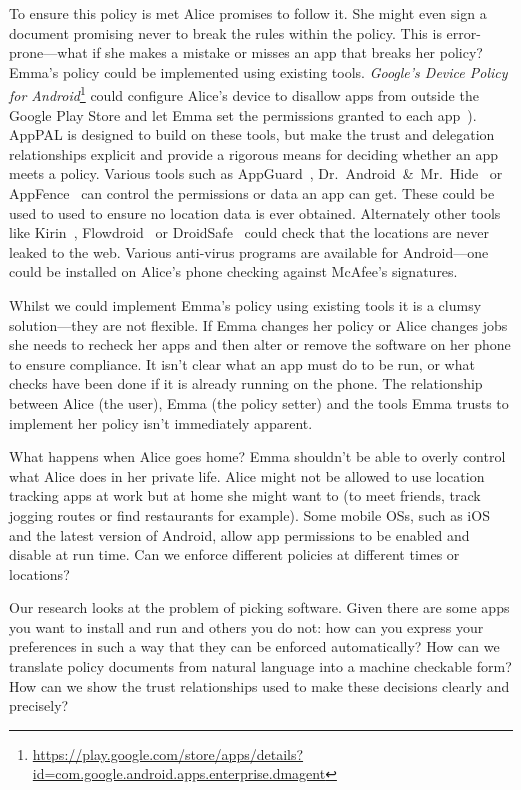 \documentclass[]{llncs}
\begin{document}
To ensure this policy is met Alice promises to follow it.
She might even sign a document promising never to break the rules within the policy.
This is error-prone---what if she makes a mistake or misses an app that breaks her policy?
Emma's policy could be implemented using existing tools.
\emph{Google's Device Policy for Android}\footnote{\url{https://play.google.com/store/apps/details?id=com.google.android.apps.enterprise.dmagent}} could configure Alice's device to disallow apps from outside the Google Play Store and let Emma set the permissions granted to each app~\cite{AndroidMPermission:2015uq}).
AppPAL is designed to build on these tools, but make the trust and delegation relationships explicit and provide a rigorous means for deciding whether an app meets a policy.
Various tools such as AppGuard~\cite{Backes:2012vm}, Dr.~Android~\&~Mr.~Hide~\cite{Jeon:2012ki} or AppFence~\cite{Hornyack:2011wq} can control the permissions or data an app can get.
These could be used to used to ensure no location data is ever obtained.
Alternately other tools like Kirin~\cite{Enck:2009ko}, Flowdroid~\cite{Fritz:2013vi} or DroidSafe~\cite{Gordon:2015et} could check that the locations are never leaked to the web.
Various anti-virus programs are available for Android---one could be installed on Alice's phone checking against McAfee's signatures.

Whilst we could implement Emma's policy using existing tools it is a clumsy solution---they are not flexible.
If Emma changes her policy or Alice changes jobs she needs to recheck her apps and then alter or remove the software on her phone to ensure compliance.
It isn't clear what an app must do to be run, or what checks have been done if it is already running on the phone.
The relationship between Alice (the user), Emma (the policy setter) and the tools Emma trusts to implement her policy isn't immediately apparent.

What happens when Alice goes home?
Emma shouldn't be able to overly control what Alice does in her private life.
Alice might not be allowed to use location tracking apps at work but at home she might want to (to meet friends, track jogging routes or find restaurants for example).
Some mobile OSs, such as iOS and the latest version of Android, allow app permissions to be enabled and disable at run time.
Can we enforce different policies at different times or locations?

Our research looks at the problem of picking software.
Given there are some apps you want to install and run and others you do not:
  how can you express your preferences in such a way that they can be enforced automatically?
How can we translate policy documents from natural language into a machine checkable form?
How can we show the trust relationships used to make these decisions clearly and precisely?
\end{document}
